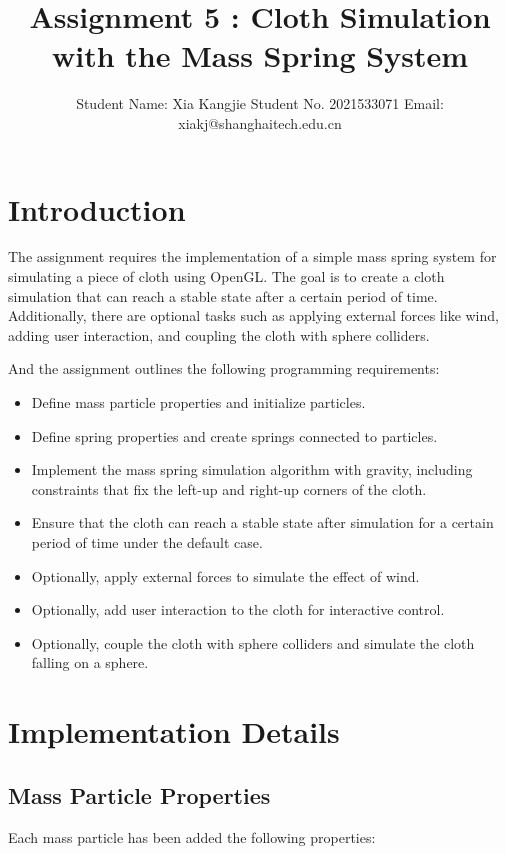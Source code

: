 \documentclass[acmtog]{acmart}
\title{Assignment 5 : Cloth Simulation with the Mass Spring System}
\author{Student Name: Xia Kangjie \quad Student No. 2021533071 \quad Email: xiakj@shanghaitech.edu.cn}
\begin{document}
\maketitle

\vspace*{2 ex}


\section{Introduction}

The assignment requires the implementation of a simple mass spring system for simulating a piece of cloth using OpenGL. The goal is to create a cloth simulation that can reach a stable state after a certain period of time. Additionally, there are optional tasks such as applying external forces like wind, adding user interaction, and coupling the cloth with sphere colliders.

And the assignment outlines the following programming requirements:

\begin{itemize}
\item Define mass particle properties and initialize particles.
\item Define spring properties and create springs connected to particles.
\item Implement the mass spring simulation algorithm with gravity, including constraints that fix the left-up and right-up corners of the cloth.
\item Ensure that the cloth can reach a stable state after simulation for a certain period of time under the default case.
\item Optionally, apply external forces to simulate the effect of wind.
\item Optionally, add user interaction to the cloth for interactive control.
\item Optionally, couple the cloth with sphere colliders and simulate the cloth falling on a sphere.
\end{itemize}

\section{Implementation Details}

\subsection{Mass Particle Properties}
Each mass particle has been added the following properties:
\end{document}
